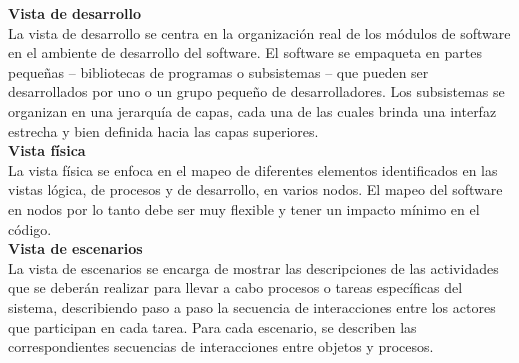 \textbf{{\large{Vista de desarrollo}}}\\

La vista de desarrollo se centra en la organización real de los módulos de software en el ambiente de desarrollo del software. El software se empaqueta en partes pequeñas – bibliotecas de programas o subsistemas – que pueden ser desarrollados por uno o un grupo pequeño de desarrolladores. Los subsistemas se organizan en una jerarquía de capas, cada una de las cuales brinda una interfaz estrecha y bien definida hacia las capas superiores.\\

\textbf{{\large{Vista física}}}\\

La vista física se enfoca en el mapeo de diferentes elementos identificados en las vistas lógica, de procesos y de desarrollo, en varios nodos.
El mapeo del software en nodos por lo tanto debe ser muy flexible y tener un impacto mínimo en el código.\\

\textbf{{\large{Vista de escenarios}}}\\

La vista de escenarios se encarga de mostrar las descripciones de las actividades que se deberán realizar para llevar a cabo procesos o tareas específicas del sistema, describiendo paso a paso la secuencia de interacciones entre los actores que participan en cada tarea.
Para cada escenario, se describen las correspondientes secuencias de interacciones entre objetos y procesos.

\clearpage






